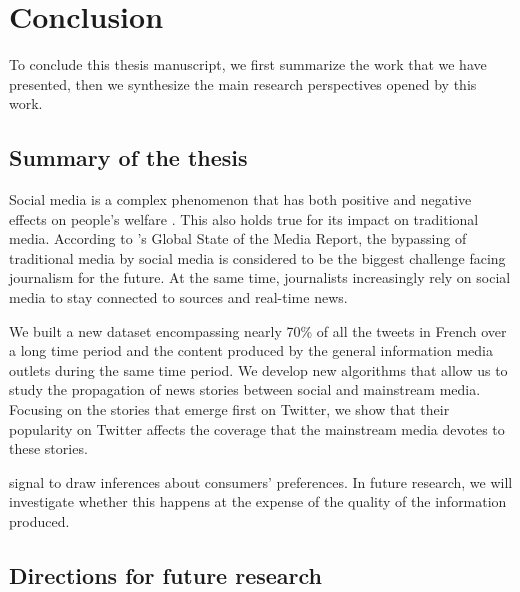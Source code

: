 \chapter{Conclusion}

To conclude this thesis manuscript, we first summarize the work that we have presented, then we synthesize the main research perspectives opened by this work.

\section{Summary of the thesis}


Social media is a complex phenomenon that has both positive and negative effects on people's welfare \citep{Allcottetal2020}. This also holds true for its impact on traditional media. According to \citet{Cision2019}'s Global State of the Media Report, the bypassing of traditional media by social media is considered to be the biggest challenge facing journalism for the future. At the same time, journalists increasingly rely on social media to stay connected to sources and real-time news.

We built a new dataset encompassing nearly 70\% of all the tweets in French over a long time period and the content produced by the general information media outlets during the same time period. We develop new algorithms that allow us to study the propagation of news stories between social and mainstream media. Focusing on the stories that emerge first on Twitter, we show that their popularity on Twitter affects the coverage that the mainstream media devotes to these stories.

signal to draw inferences about consumers' preferences. In future research, we will investigate whether this happens at the expense of the quality of the information produced.

\section{Directions for future research}